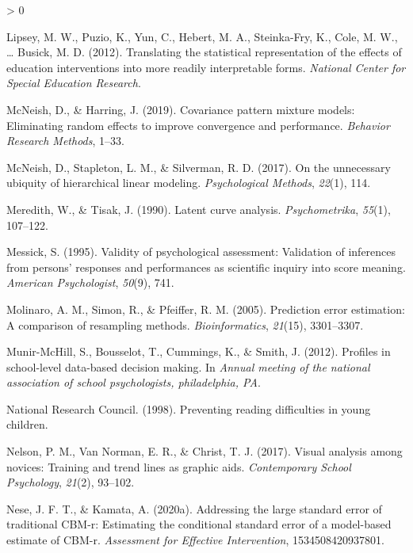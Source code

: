 \documentclass[
  english,
  man, fleqn, noextraspace]{apa6}
\newlength{\cslhangindent}
\newenvironment{CSLReferences}[2] %
 {%
  \setlength{\parindent}{0pt}
  \ifodd #1 \everypar{\setlength{\hangindent}{\cslhangindent}}\ignorespaces\fi
  \ifnum #2 > 0
  \setlength{\parskip}{#2\baselineskip}
  \fi
 }%
 {}
\begin{document}
\begin{CSLReferences}{1}{0}
\leavevmode\hypertarget{ref-lipsey2012}{}%
Lipsey, M. W., Puzio, K., Yun, C., Hebert, M. A., Steinka-Fry, K., Cole, M. W., \ldots{} Busick, M. D. (2012). Translating the statistical representation of the effects of education interventions into more readily interpretable forms. \emph{National Center for Special Education Research}.

\leavevmode\hypertarget{ref-mcneish2019}{}%
McNeish, D., \& Harring, J. (2019). Covariance pattern mixture models: Eliminating random effects to improve convergence and performance. \emph{Behavior Research Methods}, 1--33.

\leavevmode\hypertarget{ref-mcneishetal2017}{}%
McNeish, D., Stapleton, L. M., \& Silverman, R. D. (2017). On the unnecessary ubiquity of hierarchical linear modeling. \emph{Psychological Methods}, \emph{22}(1), 114.

\leavevmode\hypertarget{ref-meredithtisak1990}{}%
Meredith, W., \& Tisak, J. (1990). Latent curve analysis. \emph{Psychometrika}, \emph{55}(1), 107--122.

\leavevmode\hypertarget{ref-messick1995}{}%
Messick, S. (1995). Validity of psychological assessment: Validation of inferences from persons' responses and performances as scientific inquiry into score meaning. \emph{American Psychologist}, \emph{50}(9), 741.

\leavevmode\hypertarget{ref-molinaro2005}{}%
Molinaro, A. M., Simon, R., \& Pfeiffer, R. M. (2005). Prediction error estimation: A comparison of resampling methods. \emph{Bioinformatics}, \emph{21}(15), 3301--3307.

\leavevmode\hypertarget{ref-munir2012}{}%
Munir-McHill, S., Bousselot, T., Cummings, K., \& Smith, J. (2012). Profiles in school-level data-based decision making. In \emph{Annual meeting of the national association of school psychologists, philadelphia, PA}.

\leavevmode\hypertarget{ref-national1998}{}%
National Research Council. (1998). Preventing reading difficulties in young children.

\leavevmode\hypertarget{ref-nelson2017}{}%
Nelson, P. M., Van Norman, E. R., \& Christ, T. J. (2017). Visual analysis among novices: Training and trend lines as graphic aids. \emph{Contemporary School Psychology}, \emph{21}(2), 93--102.

\leavevmode\hypertarget{ref-nese2020sem}{}%
Nese, J. F. T., \& Kamata, A. (2020a). Addressing the large standard error of traditional CBM-r: Estimating the conditional standard error of a model-based estimate of CBM-r. \emph{Assessment for Effective Intervention}, 1534508420937801.


\end{CSLReferences}
\end{document}
